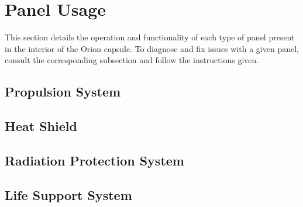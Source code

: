 \documentclass[12pt, draft]{article}
\begin{document}
\section*{Panel Usage}

This section details the operation and functionality of each type of panel present in the interior of the Orion capsule. To diagnose and fix issues with a given panel, consult the corresponding subsection and follow the instructions given.

\subsection*{Propulsion System}
\subsection*{Heat Shield}
\subsection*{Radiation Protection System}
\subsection*{Life Support System}
\end{document}
